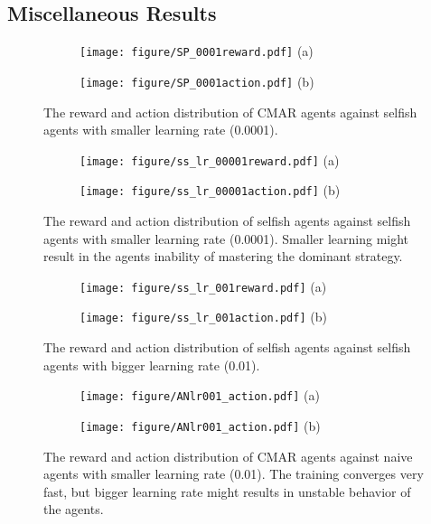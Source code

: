 \documentclass{article}
\begin{document}
\subsection{Miscellaneous Results}
\begin{figure}[!h]
    \centering
\begin{subfigure}{.45\textwidth}
\centering
\texttt{[image: figure/SP\_0001reward.pdf]}
(a)
\end{subfigure}
\begin{subfigure}{.45\textwidth}
\centering
\texttt{[image: figure/SP\_0001action.pdf]}
(b)
\end{subfigure}
    \caption{The reward and action distribution of CMAR agents against selfish agents with smaller learning rate (0.0001).}
\label{fig:misc-SP}
\end{figure}

\begin{figure}
    \centering
\begin{subfigure}{.45\textwidth}
\centering
\texttt{[image: figure/ss\_lr\_00001reward.pdf]}
(a)
\end{subfigure}
\begin{subfigure}{.45\textwidth}
\centering
\texttt{[image: figure/ss\_lr\_00001action.pdf]}
(b)
\end{subfigure}
    \caption{The reward and action distribution of selfish agents against selfish agents with smaller learning rate (0.0001). Smaller learning might result in the agents inability of mastering the dominant strategy.}
\label{fig:misc-SS}
\end{figure}

\begin{figure}
\centering
\begin{subfigure}{.45\textwidth}
\centering
\texttt{[image: figure/ss\_lr\_001reward.pdf]}
(a)
\end{subfigure}
\begin{subfigure}{.45\textwidth}
\centering
\texttt{[image: figure/ss\_lr\_001action.pdf]}
(b)
\end{subfigure}
    \caption{The reward and action distribution of selfish agents against selfish agents with bigger learning rate (0.01).}
\label{fig:misc-SSb}
\end{figure}

\begin{figure}
\centering
\begin{subfigure}{.45\textwidth}
\centering
\texttt{[image: figure/ANlr001\_action.pdf]}
(a)
\end{subfigure}
\begin{subfigure}{.45\textwidth}
\centering
\texttt{[image: figure/ANlr001\_action.pdf]}
(b)
\end{subfigure}
    \caption{The reward and action distribution of CMAR agents against naive agents with smaller learning rate (0.01). The training converges very fast, but bigger learning rate might results in unstable behavior of the agents.}
\label{fig:misc-an}
\end{figure}
\end{document}
